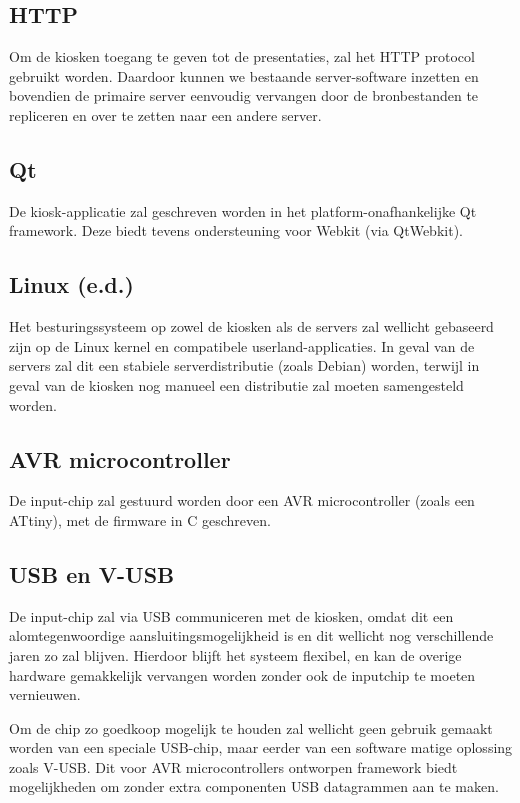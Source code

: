 \documentclass[a4paper,oneside,11pt,final]{memoir}
\begin{document}
\subsection{HTTP}

Om de kiosken toegang te geven tot de presentaties, zal het HTTP protocol gebruikt worden. Daardoor kunnen we bestaande server-software inzetten en bovendien de primaire server eenvoudig vervangen door de bronbestanden te repliceren en over te zetten naar een andere server.

\subsection{Qt}

De kiosk-applicatie zal geschreven worden in het platform-onafhankelijke Qt framework. Deze biedt tevens ondersteuning voor Webkit (via QtWebkit).

\subsection{Linux (e.d.)}

Het besturingssysteem op zowel de kiosken als de servers zal wellicht gebaseerd zijn op de Linux kernel en compatibele userland-applicaties. In geval van de servers zal dit een stabiele serverdistributie (zoals Debian) worden, terwijl in geval van de kiosken nog manueel een distributie zal moeten samengesteld worden.

\subsection{AVR microcontroller}

De input-chip zal gestuurd worden door een AVR microcontroller (zoals een ATtiny), met de firmware in C geschreven.

\subsection{USB en V-USB}

De input-chip zal via USB communiceren met de kiosken, omdat dit een alomtegenwoordige aansluitingsmogelijkheid is en dit wellicht nog verschillende jaren zo zal blijven. Hierdoor blijft het systeem flexibel, en kan de overige hardware gemakkelijk vervangen worden zonder ook de inputchip te moeten vernieuwen.

Om de chip zo goedkoop mogelijk te houden zal wellicht geen gebruik gemaakt worden van een speciale USB-chip, maar eerder van een software matige oplossing zoals V-USB. Dit voor AVR microcontrollers ontworpen framework biedt mogelijkheden om zonder extra componenten USB datagrammen aan te maken.
\end{document}
